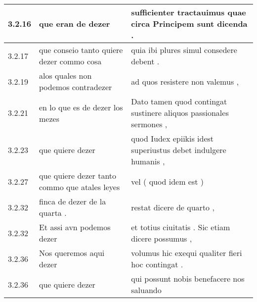 \begin{tabular}{|p{1cm}|p{6.5cm}|p{6.5cm}|}
3.2.16 & que eran de dezer & sufficienter tractauimus quae circa Principem sunt dicenda . \\\hline
3.2.17 & que conseio tanto quiere dezer commo cosa & quia ibi plures simul consedere debent . \\\hline
3.2.19 & alos quales non podemos contradezer & ad quos resistere non valemus , \\\hline
3.2.21 & en lo que es de dezer los mezes & Dato tamen quod contingat sustinere aliquos passionales sermones , \\\hline
3.2.23 & que quiere dezer & quod Iudex epiikis idest superiustus debet indulgere humanis , \\\hline
3.2.27 & que quiere dezer tanto commo que atales leyes & vel ( quod idem est ) \\\hline
3.2.32 & finca de dezer de la quarta . & restat dicere de quarto , \\\hline
3.2.32 & Et assi avn podemos dezer & et totius ciuitatis . Sic etiam dicere possumus , \\\hline
3.2.36 & Nos queremos aqui dezer & volumus hic exequi qualiter fieri hoc contingat . \\\hline
3.2.36 & que quiere dezer & qui possunt nobis benefacere nos saluando \\\hline

\end{tabular}
